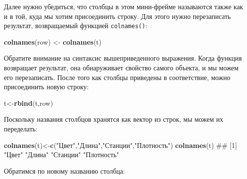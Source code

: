 \documentclass[]{book}
\newenvironment{Shaded}{\begin{snugshade}}{\end{snugshade}}
\newcommand{\KeywordTok}[1]{\textcolor[rgb]{0.13,0.29,0.53}{\textbf{#1}}}
\newcommand{\StringTok}[1]{\textcolor[rgb]{0.31,0.60,0.02}{#1}}
\newcommand{\OperatorTok}[1]{\textcolor[rgb]{0.81,0.36,0.00}{\textbf{#1}}}
\newcommand{\NormalTok}[1]{#1}
\begin{document}
Далее нужно убедиться, что столбцы в этом мини-фрейме называются также
как и в той, куда мы хотим присоединить строку. Для этого нужно
перезаписать результат, возвращаемый функцией \texttt{colnames()}:

\begin{Shaded}
\begin{Highlighting}[]
\KeywordTok{colnames}\NormalTok{(row) <-}\StringTok{ }\KeywordTok{colnames}\NormalTok{(t)}
\end{Highlighting}
\end{Shaded}

Обратите внимание на синтаксис вышеприведенного выражения. Когда функция
возвращает результат, она обнаруживает свойство самого объекта, и мы
можем его перезаписать. После того как столбцы приведены в соответствие,
можно присоединить новую строку:

\begin{Shaded}
\begin{Highlighting}[]
\NormalTok{t<-}\KeywordTok{rbind}\NormalTok{(t,row)}
\end{Highlighting}
\end{Shaded}

Поскольку названия столбцов хранятся как вектор из строк, мы можем их
переделать:

\begin{Shaded}
\begin{Highlighting}[]
\KeywordTok{colnames}\NormalTok{(t)<-}\KeywordTok{c}\NormalTok{(}\StringTok{"Цвет"}\NormalTok{,}\StringTok{"Длина"}\NormalTok{,}\StringTok{"Станции"}\NormalTok{,}\StringTok{"Плотность"}\NormalTok{)}
\KeywordTok{colnames}\NormalTok{(t)}
\NormalTok{## [1] "Цвет"      "Длина"     "Станции"   "Плотность"}
\end{Highlighting}
\end{Shaded}

Обратимся по новому названию столбца:

\begin{Shaded}
\end{Shaded}
\end{document}
